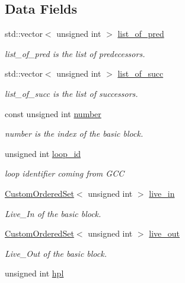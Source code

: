 \subsection*{Data Fields}
\begin{DoxyCompactItemize}
\item 
std\+::vector$<$ unsigned int $>$ \hyperlink{structbloc_af592cdd6b606c8f6ff2f9a47b3530b82}{list\+\_\+of\+\_\+pred}
\begin{DoxyCompactList}\small\item\em list\+\_\+of\+\_\+pred is the list of predecessors. \end{DoxyCompactList}\item 
std\+::vector$<$ unsigned int $>$ \hyperlink{structbloc_a8faef163b09122d4cd10c2f98735be1c}{list\+\_\+of\+\_\+succ}
\begin{DoxyCompactList}\small\item\em list\+\_\+of\+\_\+succ is the list of successors. \end{DoxyCompactList}\item 
const unsigned int \hyperlink{structbloc_a6a725128ee32d1236a67326b19cd2d3b}{number}
\begin{DoxyCompactList}\small\item\em number is the index of the basic block. \end{DoxyCompactList}\item 
unsigned int \hyperlink{structbloc_abeeab411b4c5bf2af3113e61556947b4}{loop\+\_\+id}
\begin{DoxyCompactList}\small\item\em loop identifier coming from G\+CC \end{DoxyCompactList}\item 
\hyperlink{classCustomOrderedSet}{Custom\+Ordered\+Set}$<$ unsigned int $>$ \hyperlink{structbloc_adf40e8bc34cb48a1fde9e0b17ac00e09}{live\+\_\+in}
\begin{DoxyCompactList}\small\item\em Live\+\_\+\+In of the basic block. \end{DoxyCompactList}\item 
\hyperlink{classCustomOrderedSet}{Custom\+Ordered\+Set}$<$ unsigned int $>$ \hyperlink{structbloc_a560e5cc8beef5fdd63181b993910418e}{live\+\_\+out}
\begin{DoxyCompactList}\small\item\em Live\+\_\+\+Out of the basic block. \end{DoxyCompactList}\item 
unsigned int \hyperlink{structbloc_a3f6b9c61ebddb0bc3ada5d334745fd11}{hpl}

\end{DoxyCompactItemize}
